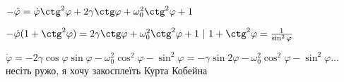 $-\dot{\varphi} = \dot{\varphi} \ctg^2 \varphi + 2\gamma\ctg \varphi + \omega_0^2 \ctg^2 \varphi + 1$

$-\dot{\varphi}(1 + \ctg^2\varphi) =  2\gamma\ctg \varphi + \omega_0^2 \ctg^2\varphi + 1\ | \ 1+\ctg^2\varphi = \frac{1}{\sin^2\varphi}$ 

$\dot{\varphi} = -2\gamma\cos\varphi\sin\varphi - \omega^2_0\cos^2\varphi - \sin^2\varphi= 
-\gamma\sin 2\varphi - \omega_0^2\cos^2\varphi - \sin^2\varphi \ldots$ несіть ружо, я хочу закосплеїть Курта Кобейна